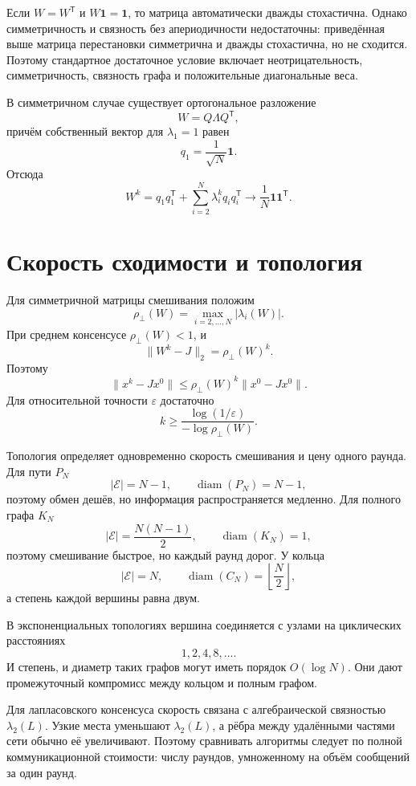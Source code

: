 Если \(W=W^{\mathsf T}\) и \(W\mathbf1=\mathbf1\), то матрица
автоматически дважды стохастична. Однако симметричность и связность
без апериодичности недостаточны: приведённая выше матрица перестановки
симметрична и дважды стохастична, но не сходится. Поэтому стандартное
достаточное условие включает неотрицательность, симметричность,
связность графа и положительные диагональные веса.

В симметричном случае существует ортогональное разложение
\[
    W=Q\Lambda Q^{\mathsf T},
\]
причём собственный вектор для \(\lambda_1=1\) равен
\[
    q_1=\frac1{\sqrt N}\mathbf1.
\]
Отсюда
\[
    W^k
    =
    q_1q_1^{\mathsf T}
    +
    \sum_{i=2}^{N}\lambda_i^kq_iq_i^{\mathsf T}
    \longrightarrow
    \frac1N\mathbf1\mathbf1^{\mathsf T}.
\]

\section{Скорость сходимости и топология}

Для симметричной матрицы смешивания положим
\[
    \rho_\perp(W)
    =
    \max_{i=2,\ldots,N}|\lambda_i(W)|.
\]
При среднем консенсусе \(\rho_\perp(W)<1\), и
\[
    \lVert W^k-J\rVert_2
    =
    \rho_\perp(W)^k.
\]
Поэтому
\[
    \lVert x^k-Jx^0\rVert
    \le
    \rho_\perp(W)^k
    \lVert x^0-Jx^0\rVert.
\]
Для относительной точности \(\varepsilon\) достаточно
\[
    k
    \ge
    \frac{\log(1/\varepsilon)}{-\log\rho_\perp(W)}.
\]

Топология определяет одновременно скорость смешивания и цену одного
раунда. Для пути \(P_N\)
\[
    |\mathcal E|=N-1,
    \qquad
    \operatorname{diam}(P_N)=N-1,
\]
поэтому обмен дешёв, но информация распространяется медленно. Для
полного графа \(K_N\)
\[
    |\mathcal E|=\frac{N(N-1)}2,
    \qquad
    \operatorname{diam}(K_N)=1,
\]
поэтому смешивание быстрое, но каждый раунд дорог. У кольца
\[
    |\mathcal E|=N,
    \qquad
    \operatorname{diam}(C_N)
    =
    \left\lfloor\frac N2\right\rfloor,
\]
а степень каждой вершины равна двум.

В экспоненциальных топологиях вершина соединяется с узлами на
циклических расстояниях
\[
    1,2,4,8,\ldots.
\]
И степень, и диаметр таких графов могут иметь порядок \(O(\log N)\).
Они дают промежуточный компромисс между кольцом и полным графом.

Для лапласовского консенсуса скорость связана с алгебраической
связностью \(\lambda_2(L)\). Узкие места уменьшают
\(\lambda_2(L)\), а рёбра между удалёнными частями сети обычно её
увеличивают. Поэтому сравнивать алгоритмы следует по полной
коммуникационной стоимости: числу раундов, умноженному на объём
сообщений за один раунд.

